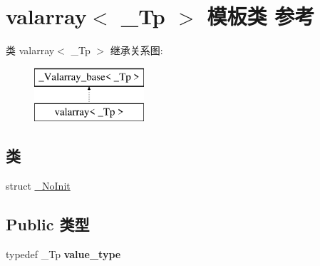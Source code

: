 \hypertarget{classvalarray}{}\section{valarray$<$ \+\_\+\+Tp $>$ 模板类 参考}
\label{classvalarray}
类 valarray$<$ \+\_\+\+Tp $>$ 继承关系图\+:\begin{figure}[H]
\begin{center}
\leavevmode
\includegraphics[height=2.000000cm]{classvalarray}
\end{center}
\end{figure}
\subsection*{类}
\begin{DoxyCompactItemize}
\item 
struct \hyperlink{structvalarray_1_1___no_init}{\+\_\+\+No\+Init}
\end{DoxyCompactItemize}
\subsection*{Public 类型}
\begin{DoxyCompactItemize}
\item 
\mbox{\label{classvalarray_aecbbaf3251e178228c668de31dea75a4}} 
typedef \+\_\+\+Tp {\bfseries value\+\_\+type}
\end{DoxyCompactItemize}
